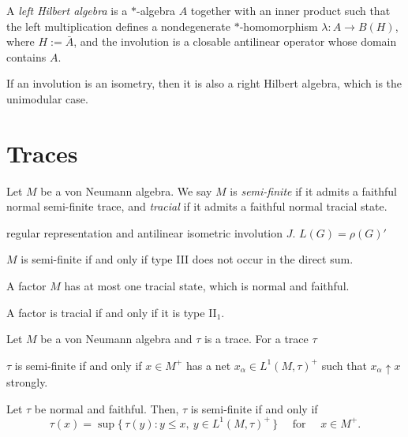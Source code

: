 \documentclass{../../large}
\begin{document}
\begin{prb}
A \emph{left Hilbert algebra} is a $*$-algebra $A$ together with an inner product such that the left multiplication defines a nondegenerate $*$-homomorphism $\lambda:A\to B(H)$, where $H:=\bar A$, and the involution is a closable antilinear operator whose domain contains $A$.

If an involution is an isometry, then it is also a right Hilbert algebra, which is the unimodular case.

\end{prb}






\section{Traces}

\begin{prb}
Let $M$ be a von Neumann algebra.
We say $M$ is \emph{semi-finite} if it admits a faithful normal semi-finite trace, and \emph{tracial} if it admits a faithful normal tracial state.
\begin{parts}
\item regular representation and antilinear isometric involution $J$. $L(G)=\rho(G)'$
\item $M$ is semi-finite if and only if type III does not occur in the direct sum.

\item A factor $M$ has at most one tracial state, which is normal and faithful.
\item A factor is tracial if and only if it is type II$_1$.
\end{parts}
\end{prb}


\begin{prb}
Let $M$ be a von Neumann algebra and $\tau$ is a trace.
For a trace $\tau$
\begin{parts}
\item $\tau$ is semi-finite if and only if $x\in M^+$ has a net $x_\alpha\in L^1(M,\tau)^+$ such that $x_\alpha\uparrow x$ strongly.
\item Let $\tau$ be normal and faithful. Then, $\tau$ is semi-finite if and only if
\[\tau(x)=\sup\{\,\tau(y):y\le x,\ y\in L^1(M,\tau)^+\,\}\quad\text{ for }\quad x\in M^+.\]
\end{parts}
\end{prb}
\end{document}
